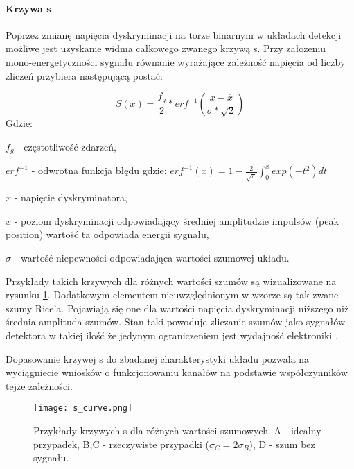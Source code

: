 \paragraph{Krzywa s}

Poprzez zmianę napięcia dyskryminacji na torze binarnym w układach detekcji możliwe jest uzyskanie widma całkowego zwanego krzywą s. Przy założeniu mono-energetyczności sygnału równanie wyrażające zależność napięcia od liczby zliczeń przybiera następującą postać:

\begin{equation}
        \label{wste krzywa s}
        S(x) = \frac{f_g}{2} * erf^{-1}(\frac{x-\overline{x}}{\sigma*\sqrt{2}})
\end{equation}
Gdzie:
\begin{description}
        \item $f_g$ - częstotliwość zdarzeń,
        \item $erf^{-1}$ - odwrotna funkcja błędu gdzie: $erf^{-1}(x) = 1 - \frac{2}{\sqrt{\pi}} \int^x_0 exp(-t^2)dt $
        \item $x$ - napięcie dyskryminatora,
        \item $\overline{x}$ - poziom dyskryminacji odpowiadający średniej amplitudzie impulsów (peak position) wartość ta odpowiada energii sygnału, 
        \item  $\sigma$ - wartość niepewności odpowiadająca wartości szumowej układu. 
\end{description}

Przykłady takich krzywych dla różnych wartości szumów są wizualizowane na rysunku \ref{wyk s curve wstep}. Dodatkowym elementem nieuwzględnionym w wzorze są tak zwane szumy Rice’a. Pojawiają się one dla wartości napięcia dyskryminacji niższego niż średnia amplituda szumów. Stan taki powoduje zliczanie szumów jako sygnałów detektora w takiej ilość że jedynym ograniczeniem jest wydajność elektroniki \cite{wiocek doctorat}.

Dopasowanie krzywej s do zbadanej charakterystyki układu pozwala na wyciągniecie wniosków o funkcjonowaniu kanałów na podstawie współczynników tejże zależności.   

\begin{figure}
        \centering
        \texttt{[image: s\_curve.png]}
        \caption{Przykłady krzywych s dla różnych wartości szumowych. A - idealny przypadek, B,C - rzeczywiste przypadki ($\sigma_C=2\sigma_B$), D - szum bez sygnału. \cite{wiocek doctorat}} 
        \label{wyk s curve wstep}
\end{figure}

